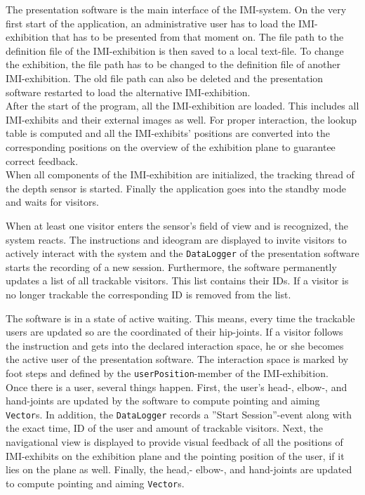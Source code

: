 The presentation software is the main interface of the \ac{IMI}-system. On the very first start of the application, an administrative user has to load the \ac{IMI}-exhibition that has to be presented from that moment on. The file path to the definition file of the \ac{IMI}-exhibition is then saved to a local text-file. To change the exhibition, the file path has to be changed to the definition file of another \ac{IMI}-exhibition. The old file path can also be deleted and the presentation software restarted to load the alternative \ac{IMI}-exhibition.
\\
After the start of the program, all the \ac{IMI}-exhibition are loaded. This includes all \ac{IMI}-exhibits and their external images as well. For proper interaction, the lookup table is computed and all the \ac{IMI}-exhibits' positions are converted into the corresponding positions on the overview of the exhibition plane to guarantee correct feedback.
\\
When all components of the \ac{IMI}-exhibition are initialized, the tracking thread of the depth sensor is started. Finally the application goes into the standby mode and waits for visitors. 

When at least one visitor enters the sensor's field of view and is recognized, the system reacts. The instructions and ideogram are displayed to invite visitors to actively interact with the system and the \texttt{DataLogger} of the presentation software starts the recording of a new session. Furthermore, the software permanently updates a list of all trackable visitors. This list contains their \ac{ID}s. If a visitor is no longer trackable the corresponding \ac{ID} is removed from the list. 

The software is in a state of active waiting. This means, every time the trackable users are updated so are the coordinated of their hip-joints. If a visitor follows the instruction and gets into the declared interaction space, he or she becomes the active user of the presentation software. The interaction space is marked by foot steps and defined by the \texttt{userPosition}-member of the \ac{IMI}-exhibition.
\\
Once there is a user, several things happen. First, the user's head-, elbow-, and hand-joints are updated by the software to compute pointing and aiming \texttt{Vector}s. In addition, the \texttt{DataLogger} records a ''Start Session''-event along with the exact time, ID of the user and amount of trackable visitors. Next, the navigational view is displayed to provide visual feedback of all the positions of \ac{IMI}-exhibits on the exhibition plane and the pointing position of the user, if it lies on the plane as well. Finally, the head,- elbow-, and hand-joints are updated to compute pointing and aiming \texttt{Vector}s.

